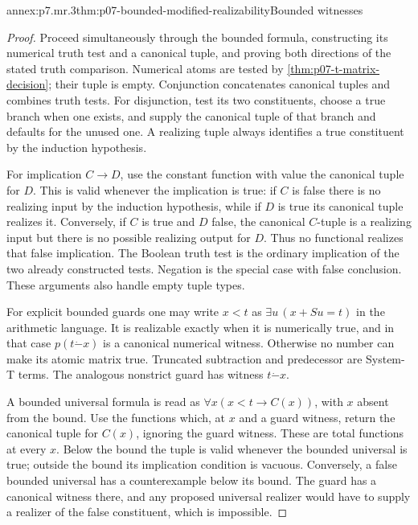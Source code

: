 \begin{annexitem}{annex:p7.mr.3}{thm:p07-bounded-modified-realizability}{Bounded witnesses}
\begin{proof}
Proceed simultaneously through the bounded formula, constructing its
numerical truth test and a canonical tuple, and proving both directions
of the stated truth comparison. Numerical atoms are tested by
\cref{thm:p07-t-matrix-decision}; their tuple is empty. Conjunction
concatenates canonical tuples and combines truth tests. For disjunction,
test its two constituents, choose a true branch when one exists, and
supply the canonical tuple of that branch and defaults for the unused
one. A realizing tuple always identifies a true constituent by the
induction hypothesis.

For implication \(C\to D\), use the constant function with value
the canonical tuple for \(D\). This is valid whenever the implication
is true: if \(C\) is false there is no realizing input by the
induction hypothesis, while if \(D\) is true its canonical tuple
realizes it. Conversely, if \(C\) is true and \(D\) false, the
canonical \(C\)-tuple is a realizing input but there is no possible
realizing output for \(D\). Thus no functional realizes that false
implication. The Boolean truth test is the ordinary implication of
the two already constructed tests. Negation is the special case with
false conclusion. These arguments also handle empty tuple types.

For explicit bounded guards one may write \(x<t\) as
\(\exists u\,(x+Su=t)\) in the arithmetic language. It is
realizable exactly when it is numerically true, and in that case
\(p(t\mathbin{\dot{-}}x)\) is a canonical numerical witness.
Otherwise no number can make its atomic matrix true. Truncated
subtraction and predecessor are System-T terms. The analogous
nonstrict guard has witness \(t\mathbin{\dot{-}}x\).

A bounded universal formula is read as
\(\forall x(x<t\to C(x))\), with \(x\) absent from the bound.
Use the functions which, at \(x\) and a guard witness, return the
canonical tuple for \(C(x)\), ignoring the guard witness. These
are total functions at every \(x\). Below the bound the tuple is
valid whenever the bounded universal is true; outside the bound its
implication condition is vacuous. Conversely, a false bounded universal
has a counterexample below its bound. The guard has a canonical witness
there, and any proposed universal realizer would have to supply a
realizer of the false constituent, which is impossible.


\end{proof}
\end{annexitem}
